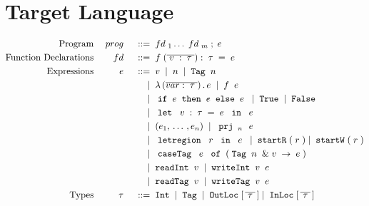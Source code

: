 \documentclass[12pt]{article}
\newcommand{\gramdef}{\; ::= \;}
\newcommand{\gramor}{\; | \;}
\newcommand{\PROG}{\keywd{prog}}
\newcommand{\EXPR}{\keywd{e}}
\newcommand{\TYP}{\keywd{\tau}}
\newcommand{\FD}{\keywd{fd}}
\newcommand{\keywd}[1]{\; {#1} \;}
\newcommand{\gramwd}[1]{\; \texttt{#1} \;}
\newcommand{\var}{\; \svar \;}
\newcommand{\svar}{v}
\newcommand{\fvar}{\; \sfvar \;}
\newcommand{\sfvar}{f}
\newcommand{\num}{\; n \;}
\newcommand{\letexpr}[3]{\;\gramwd{let} \; #1 = #2 \; \gramwd{in} \; #3 \;}
\newcommand{\ife}[3]{\; \gramwd{if}#1\gramwd{then}#2\gramwd{else}#3 \;}
\newcommand{\project}[2]{\; \gramwd{prj}_{#1}\,{#2}\;}
\newcommand{\anonfun}[2]{\; \lambda\,(#1)\,.\,#2\;}
\newcommand{\letregion}[2]{\; \gramwd{letregion}\;#1\; \gramwd{in}\; #2 \;}
\newcommand{\REG}{\keywd{r}}
\newcommand{\casetag}[3]{\; \gramwd{caseTag}\;#1\;\gramwd{of}\;(#2 \rightarrow #3)\;}
\begin{document}
\section{Target Language}

\begin{displaymath}
  \begin{aligned}
      \textup{Program} && \PROG && \gramdef & \FD_1 \ldots \FD_m \; ; \EXPR \\
      \textup{Function Declarations} && \FD && \gramdef & \fvar(\overline{\var:\TYP}) : \TYP = \EXPR \\
      \textup{Expressions} && \EXPR && \gramdef & \var \gramor \num \gramor \gramwd{Tag}\num \\
      && && \gramor & \anonfun{\overline{var : \TYP}}{e} \gramor \fvar \EXPR \\
      && && \gramor & \ife{\EXPR}{\EXPR}{\EXPR} \gramor \gramwd{True} \gramor \gramwd{False} \\
      && && \gramor & \letexpr{\var:\TYP}{\EXPR}{\EXPR} \\
      && && \gramor & \;(e_1,\, \dots\, , e_n)\; \gramor \project{\num}{\EXPR} \\
      && && \gramor & \letregion{\REG}{\EXPR} \gramor \gramwd{startR}(\REG) \gramor \gramwd{startW}(\REG) \\
      && && \gramor & \casetag{\EXPR}{\gramwd{Tag}\num \;\& \var}{\EXPR} \\
      && && \gramor & \gramwd{readInt} \var \gramor \gramwd{writeInt} \var \EXPR \\
      && && \gramor & \gramwd{readTag} \var \gramor \gramwd{writeTag} \var \EXPR \\
      \textup{Types} && \TYP && \gramdef & \gramwd{Int} \gramor \gramwd{Tag} \gramor \gramwd{OutLoc} [\,\overline{\TYP}\,] \gramor \gramwd{InLoc} [\,\overline{\TYP}\,]
  \end{aligned}
\end{displaymath}
\end{document}
